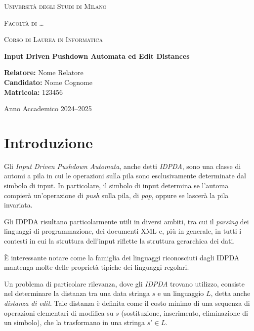 \documentclass[a4paper,12pt]{report}
\begin{document}
\begin{titlepage}
    \centering
    {\scshape\LARGE Università degli Studi di Milano \par}
    \vspace{1cm}
    {\scshape\Large Facoltà di \ldots\par}
    \vspace{0.5cm}
    {\scshape\large Corso di Laurea in Informatica\par}
    \vspace{2cm}
    {\huge\bfseries Input Driven Pushdown Automata ed Edit Distances\par}
    \vspace{2cm}
    \begin{flushleft}
        \textbf{Relatore:} Nome Relatore\\
        \textbf{Candidato:} Nome Cognome\\
        \textbf{Matricola:} 123456
    \end{flushleft}
    \vfill
    {\large Anno Accademico 2024--2025\par}
\end{titlepage}


\tableofcontents
\clearpage




\chapter{Introduzione}


Gli \emph{Input Driven Pushdown Automata}, anche detti \textit{IDPDA}, sono una classe di automi a pila in cui le operazioni sulla pila sono esclusivamente determinate dal simbolo di input. In particolare, il simbolo di input determina se l'automa compierà un'operazione di \emph{push} sulla pila, di \emph{pop}, oppure se lascerà la pila invariata.


Gli IDPDA risultano particolarmente utili in diversi ambiti, tra cui il \emph{parsing} dei linguaggi di programmazione, dei documenti XML e, più in generale, in tutti i contesti in cui la struttura dell'input riflette la struttura gerarchica dei dati.


È interessante notare come la famiglia dei linguaggi riconosciuti dagli IDPDA mantenga molte delle proprietà tipiche dei linguaggi regolari.


Un problema di particolare rilevanza, dove gli \textit{IDPDA} trovano utilizzo, consiste nel determinare la distanza tra una data stringa $s$ e un linguaggio $L$, detta anche \textit{distanza di edit}. Tale distanza è definita come il costo minimo di una sequenza di operazioni elementari di modifica su $s$ (sostituzione, inserimento, eliminazione di un simbolo), che la trasformano in una stringa $s' \in L$.
\end{document}
